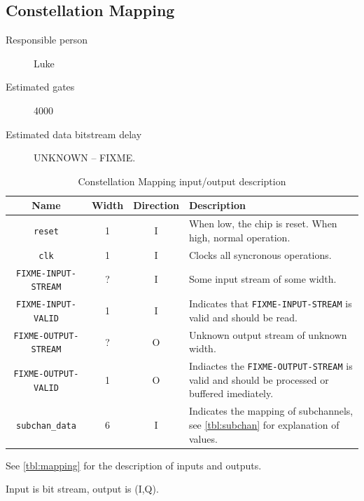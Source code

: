 \documentclass[dvips,10pt,twocolumn]{article}
\newcommand{\wire}{\texttt}
\begin{document}

\subsection{Constellation Mapping}
\label{sec:constellation}
\begin{description}
	\item[Responsible person] Luke
	\item[Estimated gates] 4000
	\item[Estimated data bitstream delay] UNKNOWN -- FIXME.
\end{description}

\begin{table} \begin{tabularx}{\linewidth}{c|c|c|X}
	\label{tbl:mapping-io}
	Name & Width & Direction & Description \\ \hline

	\wire{reset} & 1 & I & When low, the chip is reset. When high, normal
	operation. \\

	\wire{clk}   & 1 & I & Clocks all syncronous operations. \\

	\wire{FIXME-INPUT-STREAM} & ? & I & Some input stream of some width.
	\\

	\wire{FIXME-INPUT-VALID} & 1 & I & Indicates that
	\wire{FIXME-INPUT-STREAM} is valid and should be read. \\

	\wire{FIXME-OUTPUT-STREAM} & ? & O & Unknown output stream of unknown
	width. \\

	\wire{FIXME-OUTPUT-VALID} & 1 & O & Indiactes the
	\wire{FIXME-OUTPUT-STREAM} is valid and should be processed or
	buffered imediately. \\

	\wire{subchan\_data} & 6 & I & Indicates the mapping of subchannels, see
	\autoref{tbl:subchan} for explanation of values. \\

\end{tabularx} \caption{Constellation Mapping input/output description}
\end{table}

See \autoref{tbl:mapping} for the description of inputs and outputs.

Input is bit stream, output is (I,Q).
\end{document}
